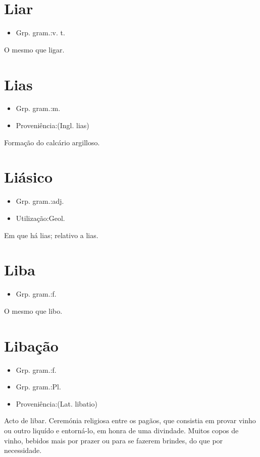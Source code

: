 \section{Liar}
\begin{itemize}
\item {Grp. gram.:v. t.}
\end{itemize}
O mesmo que \textunderscore ligar\textunderscore .
\section{Lias}
\begin{itemize}
\item {Grp. gram.:m.}
\end{itemize}
\begin{itemize}
\item {Proveniência:(Ingl. \textunderscore lias\textunderscore )}
\end{itemize}
Formação do calcário argilloso.
\section{Liásico}
\begin{itemize}
\item {Grp. gram.:adj.}
\end{itemize}
\begin{itemize}
\item {Utilização:Geol.}
\end{itemize}
Em que há lias; relativo a lias.
\section{Liba}
\begin{itemize}
\item {Grp. gram.:f.}
\end{itemize}
O mesmo que \textunderscore libo\textunderscore .
\section{Libação}
\begin{itemize}
\item {Grp. gram.:f.}
\end{itemize}
\begin{itemize}
\item {Grp. gram.:Pl.}
\end{itemize}
\begin{itemize}
\item {Proveniência:(Lat. \textunderscore libatio\textunderscore )}
\end{itemize}
Acto de libar.
Ceremónia religiosa entre os pagãos, que consistia em provar vinho ou outro liquído e entorná-lo, em honra de uma divindade.
Muitos copos de vinho, bebidos mais por prazer ou para se fazerem brindes, do que por necessidade.
